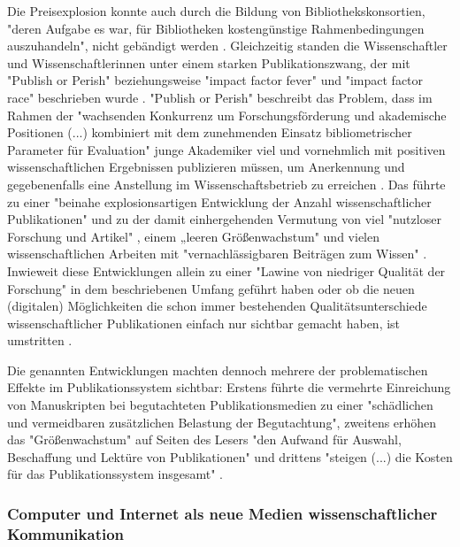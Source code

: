 Die Preisexplosion konnte auch durch die Bildung von Bibliothekskonsortien, "deren Aufgabe es war, für Bibliotheken kostengünstige Rahmenbedingungen auszuhandeln", nicht gebändigt werden \cite{Fladung_2003} \cite{Brintzinger_2010}. Gleichzeitig standen die Wissenschaftler und Wissenschaftlerinnen unter einem starken Publikationszwang, der mit "Publish or Perish" \cite{CLAPHAM_2005} beziehungsweise "impact factor fever" \cite{Cherubini_2008} und "impact factor race" \cite{Brischoux_2009} beschrieben wurde \cite{offhaus_2012_institutionelle_repos}. "Publish or Perish" beschreibt das Problem, dass im Rahmen der "wachsenden Konkurrenz um Forschungsförderung und akademische Positionen (...) kombiniert mit dem zunehmenden Einsatz bibliometrischer Parameter für Evaluation" \cite{Fanelli_2010} junge Akademiker viel und vornehmlich mit positiven wissenschaftlichen Ergebnissen publizieren müssen, um Anerkennung und gegebenenfalls eine Anstellung im Wissenschaftsbetrieb zu erreichen \cite{pscheida_2010_wikipedia} \cite{Beasley_2005} \cite{hamilton_1990_publishing}. Das führte zu einer "beinahe explosionsartigen Entwicklung der Anzahl wissenschaftlicher Publikationen" \cite{bortz_Doering_2006_fragestellung} und zu der damit einhergehenden Vermutung von viel "nutzloser Forschung und Artikel" \cite{smith1990killing}, einem „leeren Größenwachstum" \cite{bbaw_publizieren_2015} und vielen wissenschaftlichen Arbeiten mit "vernachlässigbaren Beiträgen zum Wissen" \cite{hamilton_1990_publishing}. Inwieweit diese Entwicklungen allein zu einer "Lawine von niedriger Qualität der Forschung" \cite{Bauerlein_2010} in dem beschriebenen Umfang geführt haben oder ob die neuen (digitalen) Möglichkeiten die schon immer bestehenden Qualitätsunterschiede wissenschaftlicher Publikationen einfach nur sichtbar gemacht haben, ist umstritten \cite{rekdal_2014_academic}.

Die genannten Entwicklungen machten dennoch mehrere der problematischen Effekte im Publikationssystem sichtbar: Erstens führte die vermehrte Einreichung von Manuskripten bei begutachteten Publikationsmedien zu einer "schädlichen und vermeidbaren zusätzlichen Belastung der Begutachtung", zweitens erhöhen das "Größenwachstum" auf Seiten des Lesers "den Aufwand für Auswahl, Beschaffung und Lektüre von Publikationen" und drittens "steigen (...) die Kosten für das Publikationssystem insgesamt" \cite{bbaw_publizieren_2015}.

\subsubsection{Computer und Internet als neue Medien wissenschaftlicher Kommunikation}

